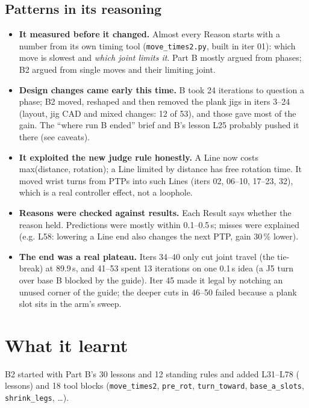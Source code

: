 \subsection*{Patterns in its reasoning}
\begin{itemize}
\item \textbf{It measured before it changed.} Almost every Reason starts with a number from its own timing tool
  (\texttt{move\_times2.py}, built in iter 01): which move is slowest and \emph{which joint limits it}. Part B mostly
  argued from phases; B2 argued from single moves and their limiting joint.
\item \textbf{Design changes came early this time.} B took 24 iterations to question a phase; B2 moved, reshaped and
  then removed the plank jigs in iters 3--24 (layout, jig CAD and mixed changes: 12 of 53), and those gave most of the
  gain. The ``where run B ended'' brief and B's lesson L25 probably pushed it there (see caveats).
\item \textbf{It exploited the new judge rule honestly.} A Line now costs max(distance, rotation); a Line limited by
  distance has free rotation time. It moved wrist turns from PTPs into such Lines (iters 02, 06--10, 17--23, 32), which
  is a real controller effect, not a loophole.
\item \textbf{Reasons were checked against results.} Each Result says whether the reason held. Predictions were mostly
  within 0.1--0.5\,s; misses were explained (e.g. L58: lowering a Line end also changes the next PTP, gain 30\,\% lower).
\item \textbf{The end was a real plateau.} Iters 34--40 only cut joint travel (the tie-break) at 89.9\,s, and 41--53
  spent 13 iterations on one 0.1\,s idea (a J5 turn over base B blocked by the guide). Iter 45 made it legal by
  notching an unused corner of the guide; the deeper cuts in 46--50 failed because a plank slot sits in the arm's sweep.
\end{itemize}

\section{What it learnt}
B2 started with Part B's 30 lessons and 12 standing rules and added L31--L78 (\pbtwonlessons{} lessons) and 18 tool
blocks (\texttt{move\_times2}, \texttt{pre\_rot}, \texttt{turn\_toward}, \texttt{base\_a\_slots}, \texttt{shrink\_legs}, \ldots).

